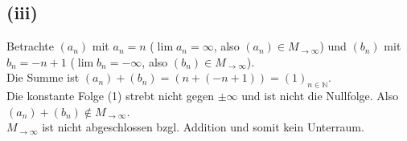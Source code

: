 \documentclass{article}
\begin{document}
\subsection*{(iii)}
Betrachte $(a_n)$ mit $a_n = n$ ($\lim a_n = \infty$, also $(a_n) \in M_{\rightarrow \infty}$) und $(b_n)$ mit $b_n = -n+1$ ($\lim b_n = -\infty$, also $(b_n) \in M_{\rightarrow \infty}$). \\
Die Summe ist $(a_n) + (b_n) = (n + (-n+1)) = (1)_{n\in\mathbb{N}}$. \\
Die konstante Folge (1) strebt nicht gegen $\pm\infty$ und ist nicht die Nullfolge. Also $(a_n)+(b_n) \notin M_{\rightarrow \infty}$. \\
$M_{\rightarrow \infty}$ ist nicht abgeschlossen bzgl. Addition und somit kein Unterraum. 
\end{document}
